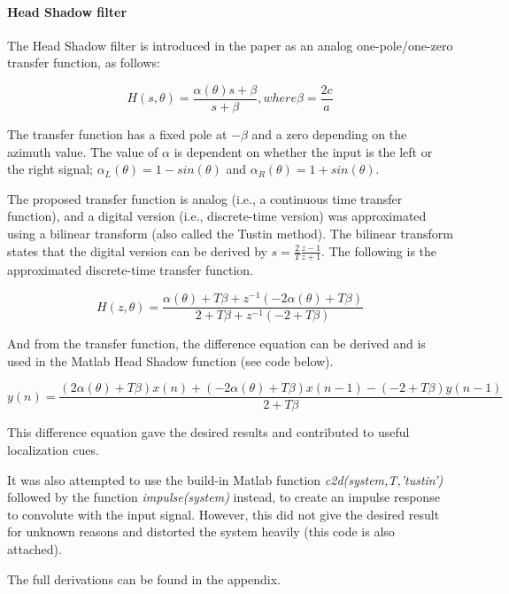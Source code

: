 \documentclass{assignment}
\begin{document}
\paragraph{Head Shadow filter \newline}

The Head Shadow filter is introduced in the paper as an analog one-pole/one-zero transfer function, as follows: 

\[H(s,\theta)=\frac{\alpha(\theta)s + \beta}{s + \beta}, where \beta = \frac{2c}{a}\]

The transfer function has a fixed pole at  $-\beta$ and a zero depending on the azimuth value. The value of $\alpha$ is dependent on whether the input is the left or the right signal; $\alpha$$_{L}(\theta) = 1 - sin(\theta)$ and $\alpha$$_{R}(\theta) = 1 + sin(\theta)$. \newline

The proposed transfer function is analog (i.e., a continuous time transfer function), and a digital version (i.e., discrete-time version) was approximated using a bilinear transform (also called the Tustin method). The bilinear transform states that the digital version can be derived by $s = \frac{2}{T}\frac{z-1}{z+1}$. The following is the approximated discrete-time transfer function.

\[H(z,\theta)=\frac{\alpha(\theta) + T\beta + z^{-1}(-2\alpha(\theta) + T\beta)}{2 + T\beta+z^{-1}(-2 + T\beta)}\]

And from the transfer function, the difference equation can be derived and is used in the Matlab Head Shadow function (see code below). 

\[y(n) = \frac{(2\alpha(\theta) + T\beta)x(n) + (-2\alpha(\theta) + T\beta)x(n-1) - (-2 + T\beta)y(n-1)} {2 + T\beta}\]

This difference equation gave the desired results and contributed to useful localization cues.\newline

It was also attempted to use the build-in Matlab function \textit{c2d(system,T,'tustin')} followed by the function \textit{impulse(system)} instead, to create an impulse response to convolute with the input signal. However, this did not give the desired result for unknown reasons and distorted the system heavily (this code is also attached). \newline


The full derivations can be found in the appendix.


\end{document}
